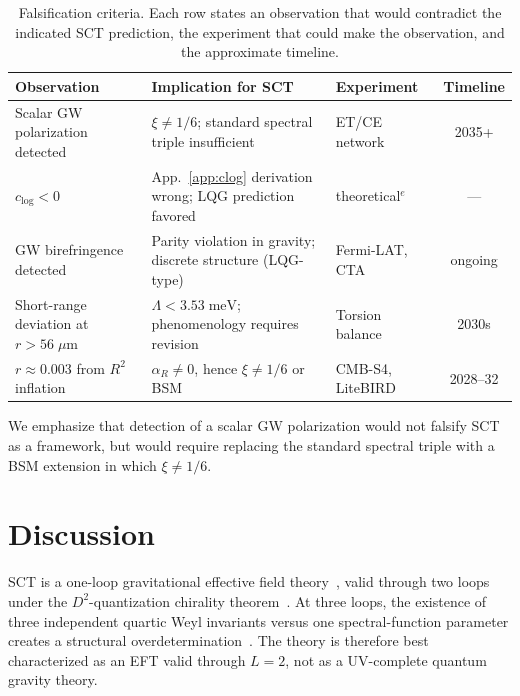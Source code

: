 \documentclass[12pt,a4paper]{article}
\theoremstyle{plain}
\theoremstyle{definition}
\theoremstyle{remark}
\begin{document}
\begin{table}[ht]
\centering
\caption{Falsification criteria.  Each row states an observation
that would contradict the indicated SCT prediction, the
experiment that could make the observation, and the approximate
timeline.}
\label{tab:falsification}
\begin{tabular}{p{3.2cm}p{3.5cm}p{2.5cm}c}
\toprule
Observation & Implication for SCT & Experiment & Timeline \\
\midrule
Scalar GW polarization detected &
  $\xi \neq 1/6$; standard spectral triple insufficient &
  ET/CE network & 2035+ \\[4pt]
$c_{\log} < 0$ &
  App.~\ref{app:clog} derivation wrong; LQG prediction favored &
  theoretical${}^e$ & --- \\[4pt]
GW birefringence detected &
  Parity violation in gravity; discrete structure (LQG-type) &
  Fermi-LAT, CTA & ongoing \\[4pt]
Short-range deviation at $r > 56\;\mu$m &
  $\Lambda < 3.53\;\mathrm{meV}$; phenomenology requires
  revision &
  Torsion balance & 2030s \\[4pt]
$r \approx 0.003$ from $R^2$ inflation &
  $\alpha_R \neq 0$, hence $\xi \neq 1/6$ or BSM &
  CMB-S4, LiteBIRD & 2028--32 \\
\bottomrule
\end{tabular}

\smallskip{}
\end{table}

We emphasize that detection of a scalar GW polarization would
not falsify SCT as a framework, but would require replacing the
standard spectral triple with a BSM extension in which
$\xi \neq 1/6$.

\section{Discussion}
\label{sec:discussion}

SCT is a one-loop gravitational effective field
theory~\cite{Donoghue:1994}, valid through two loops under the
$D^2$-quantization chirality
theorem~\cite{Alfyorov:2026paper3}.  At three loops, the
existence of three independent quartic Weyl invariants versus one
spectral-function parameter creates a structural
overdetermination~\cite{Alfyorov:2026paper3}.  The theory is
therefore best characterized as an EFT valid through $L = 2$,
not as a UV-complete quantum gravity theory.
\end{document}
